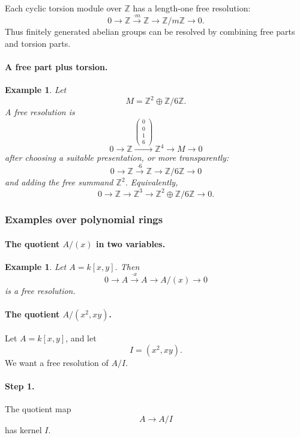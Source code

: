 \documentclass[12pt,a4paper]{article}
\theoremstyle{notespace}
\newtheorem{example}[definition]{Example}
\newcommand{\ZZ}{\mathbb{Z}}
\begin{document}
Each cyclic torsion module over \(\ZZ\) has a length-one free resolution:
\[
0\to \ZZ \xrightarrow{\cdot m} \ZZ \to \ZZ/m\ZZ\to 0.
\]
Thus finitely generated abelian groups can be resolved by combining free parts and torsion parts.

\paragraph{A free part plus torsion.}

\begin{example}
	Let
	\[
	M=\ZZ^2\oplus \ZZ/6\ZZ.
	\]
	A free resolution is
	\[
	0\to \ZZ \xrightarrow{\begin{pmatrix}0\\0\\1\\6\end{pmatrix}} \ZZ^4 \to M\to 0
	\]
	after choosing a suitable presentation, or more transparently:
	\[
	0\to \ZZ \xrightarrow{\cdot 6} \ZZ \to \ZZ/6\ZZ\to 0
	\]
	and adding the free summand \(\ZZ^2\). Equivalently,
	\[
	0\to \ZZ \to \ZZ^3 \to \ZZ^2\oplus \ZZ/6\ZZ \to 0.
	\]
\end{example}

\subsubsection{Examples over polynomial rings}

\paragraph{The quotient \(A/(x)\) in two variables.}

\begin{example}
	Let \(A=k[x,y]\). Then
	\[
	0\to A \xrightarrow{\cdot x} A \to A/(x)\to 0
	\]
	is a free resolution.
\end{example}

\paragraph{The quotient \(A/(x^2,xy)\).}

Let \(A=k[x,y]\), and let
\[
I=(x^2,xy).
\]
We want a free resolution of \(A/I\).

\paragraph{Step 1.}

The quotient map
\[
A\to A/I
\]
has kernel \(I\).
\end{document}
